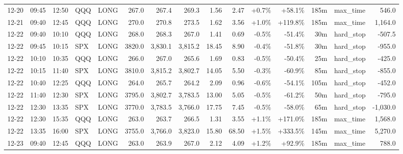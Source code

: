\documentclass[11pt,a4paper,twoside]{article}
\begin{document}
\begin{landscape}
\begin{center}
\begin{longtable}{>{\color{txtmain}}l l l l l r r r r r r r r >{\color{txtmain}}l r}
12-20 & 09:45 & 12:50 & QQQ & LONG & 267.0 & 267.4 & 269.3 & 1.56 & 2.47 & \textcolor{wingreen}{+0.7\%} & \textcolor{wingreen}{+58.1\%} & 185m & max\_time & \textcolor{wingreen}{546.0} \\
12-21 & 09:40 & 12:45 & QQQ & LONG & 270.0 & 270.8 & 273.5 & 1.62 & 3.56 & \textcolor{wingreen}{+1.0\%} & \textcolor{wingreen}{+119.8\%} & 185m & max\_time & \textcolor{wingreen}{1,164.0} \\
12-22 & 09:40 & 10:10 & QQQ & LONG & 268.0 & 268.3 & 267.0 & 1.41 & 0.69 & \textcolor{lossred}{-0.5\%} & \textcolor{lossred}{-51.4\%} & 30m & hard\_stop & \textcolor{lossred}{-507.5} \\
12-22 & 09:45 & 10:15 & SPX & LONG & 3820.0 & 3,830.1 & 3,815.2 & 18.45 & 8.90 & \textcolor{lossred}{-0.4\%} & \textcolor{lossred}{-51.8\%} & 30m & hard\_stop & \textcolor{lossred}{-955.0} \\
12-22 & 10:10 & 10:35 & QQQ & LONG & 266.0 & 267.0 & 265.6 & 1.69 & 0.83 & \textcolor{lossred}{-0.5\%} & \textcolor{lossred}{-50.4\%} & 25m & hard\_stop & \textcolor{lossred}{-425.0} \\
12-22 & 10:15 & 11:40 & SPX & LONG & 3810.0 & 3,815.2 & 3,802.7 & 14.05 & 5.50 & \textcolor{lossred}{-0.3\%} & \textcolor{lossred}{-60.9\%} & 85m & hard\_stop & \textcolor{lossred}{-855.0} \\
12-22 & 10:40 & 12:25 & QQQ & LONG & 264.0 & 265.7 & 264.2 & 2.09 & 0.96 & \textcolor{lossred}{-0.6\%} & \textcolor{lossred}{-54.1\%} & 105m & hard\_stop & \textcolor{lossred}{-452.0} \\
12-22 & 11:40 & 12:30 & SPX & LONG & 3795.0 & 3,802.7 & 3,783.5 & 13.00 & 5.05 & \textcolor{lossred}{-0.5\%} & \textcolor{lossred}{-61.2\%} & 50m & hard\_stop & \textcolor{lossred}{-795.0} \\
12-22 & 12:30 & 13:35 & SPX & LONG & 3770.0 & 3,783.5 & 3,766.0 & 17.75 & 7.45 & \textcolor{lossred}{-0.5\%} & \textcolor{lossred}{-58.0\%} & 65m & hard\_stop & \textcolor{lossred}{-1,030.0} \\
12-22 & 12:30 & 15:35 & QQQ & LONG & 263.0 & 263.7 & 266.5 & 1.31 & 3.55 & \textcolor{wingreen}{+1.1\%} & \textcolor{wingreen}{+171.0\%} & 185m & max\_time & \textcolor{wingreen}{1,568.0} \\
12-22 & 13:35 & 16:00 & SPX & LONG & 3755.0 & 3,766.0 & 3,823.0 & 15.80 & 68.50 & \textcolor{wingreen}{+1.5\%} & \textcolor{wingreen}{+333.5\%} & 145m & max\_time & \textcolor{wingreen}{5,270.0} \\
12-23 & 09:40 & 12:45 & QQQ & LONG & 263.0 & 263.9 & 267.0 & 2.12 & 4.09 & \textcolor{wingreen}{+1.2\%} & \textcolor{wingreen}{+92.9\%} & 185m & max\_time & \textcolor{wingreen}{788.0} \\

\end{longtable}
\end{center}
\end{landscape}
\end{document}
